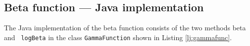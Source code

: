 \documentclass[twoside]{book}
\begin{document}
\subsection{Beta function --- Java implementation}
\label{secj:betafunc} The Java implementation of
the beta function consists of the two methods beta and {\tt
logBeta} in the class {\tt GammaFunction} shown in Listing
\ref{lj:gammafunc}.



\ifx\wholebook\relax\else
\end{document}
